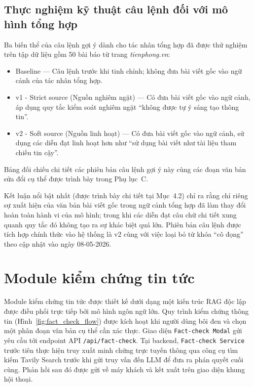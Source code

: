 \subsection{Thực nghiệm kỹ thuật câu lệnh đối với mô hình tổng hợp}

Ba biến thể của câu lệnh gợi ý dành cho tác nhân tổng hợp đã được thử nghiệm trên tập dữ liệu gồm 50 bài báo từ trang \textit{tienphong.vn}:

\begin{itemize}
  \item Baseline --- Câu lệnh trước khi tinh chỉnh; không đưa bài viết gốc vào ngữ cảnh của tác nhân tổng hợp.
  \item v1 - Strict source (Nguồn nghiêm ngặt) --- Có đưa bài viết gốc vào ngữ cảnh, áp dụng quy tắc kiểm soát nghiêm ngặt ``không được tự ý sáng tạo thông tin''.
  \item v2 - Soft source (Nguồn linh hoạt) --- Có đưa bài viết gốc vào ngữ cảnh, sử dụng các diễn đạt linh hoạt hơn như ``sử dụng bài viết như tài liệu tham chiếu tin cậy''.
\end{itemize}

Bảng đối chiếu chi tiết các phiên bản câu lệnh gợi ý này cùng các đoạn văn bản sửa đổi cụ thể được trình bày trong Phụ lục~C.

Kết luận nổi bật nhất (được trình bày chi tiết tại Mục~4.2) chỉ ra rằng chỉ riêng sự xuất hiện của văn bản bài viết gốc trong ngữ cảnh tổng hợp đã làm thay đổi hoàn toàn hành vi của mô hình; 
trong khi các diễn đạt câu chữ chi tiết xung quanh quy tắc đó không tạo ra sự khác biệt quá lớn. 
Phiên bản câu lệnh được tích hợp chính thức vào hệ thống là v2 cùng với việc loại bỏ từ khóa ``cô đọng'' theo cập nhật vào ngày 08-05-2026.

\section{Module kiểm chứng tin tức}

Module kiểm chứng tin tức được thiết kế dưới dạng một kiến trúc RAG độc lập được điều phối trực tiếp bởi mô hình ngôn ngữ lớn. 
Quy trình kiểm chứng thông tin (Hình~\ref{fig:fact_check_flow}) được kích hoạt khi người dùng bôi đen và chọn một phân đoạn văn bản cụ thể cần xác thực. 
Giao diện \texttt{Fact-check Modal} gửi yêu cầu tới endpoint API \texttt{/api/fact-check}. 
Tại backend, \texttt{Fact-check Service} trước tiên thực hiện truy xuất minh chứng trực tuyến thông qua công cụ tìm kiếm Tavily Search 
trước khi gửi truy vấn đến LLM để đưa ra phán quyết cuối cùng. Phản hồi sau đó được gửi về máy khách và kết xuất trên giao diện khung hội thoại.

